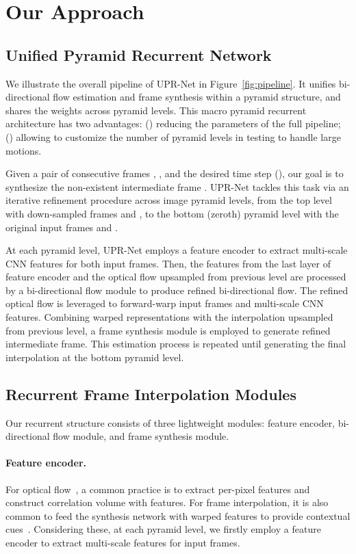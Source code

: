 \documentclass[10pt,twocolumn,letterpaper]{article}
\begin{document}
\section{Our Approach}
\label{sec:approach}




\subsection{Unified Pyramid Recurrent Network}

We illustrate the overall pipeline of UPR-Net in Figure~\ref{fig:pipeline}. It
unifies bi-directional flow estimation and frame synthesis within a pyramid
structure, and shares the weights across pyramid levels. This macro pyramid
recurrent architecture has two advantages: () reducing the
parameters of the full pipeline; () allowing to customize the
number of pyramid levels in testing to handle large motions.


Given a pair of consecutive frames , , and the desired time step 
(), our goal is to synthesize the non-existent intermediate
frame .  UPR-Net tackles this task via an iterative refinement procedure
across  image pyramid levels, from the top level with down-sampled frames
 and , to the bottom (zeroth) pyramid level with the
original input frames  and .


At each pyramid level, UPR-Net employs a feature encoder to extract multi-scale
CNN features for both input frames. Then, the features from the last layer of
feature encoder and the optical flow upsampled from previous level are processed
by a bi-directional flow module to produce refined bi-directional flow. The
refined optical flow is leveraged to forward-warp input frames and multi-scale
CNN features.  Combining warped representations with the interpolation upsampled
from previous level, a frame synthesis module is employed to generate refined
intermediate frame. This estimation process is repeated until generating the
final interpolation at the bottom pyramid level.



\subsection{Recurrent Frame Interpolation Modules}
Our recurrent structure consists of three lightweight modules: feature encoder,
bi-directional flow module, and frame synthesis module.

\paragraph{Feature encoder.} For optical flow~\cite{sun2018pwc,teed2020raft}, a
common practice is to extract per-pixel features and construct correlation
volume with features. For frame interpolation, it is also common to feed the
synthesis network with warped features to provide contextual
cues~\cite{niklaus2020softmax,huang2020rife}.  Considering these, at each
pyramid level, we firstly employ a feature encoder to extract multi-scale
features for input frames.
\end{document}

